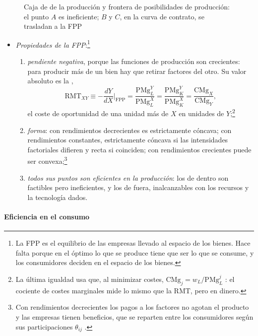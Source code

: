 \documentclass[11pt]{article}
\begin{document}
\begin{figure}[H]
\centering
\caption{Caja de  de la producción y frontera de posibilidades de producción: el punto $A$ es ineficiente; $B$ y $C$, en la curva de contrato, se trasladan a la FPP}\label{fig:caja-edgeworth-fpp}
\end{figure}

\begin{itemize}
\item \emph{Propiedades de la FPP}:\footnote{La FPP es el equilibrio de las empresas llevado al espacio de los bienes. Hace falta porque en el óptimo lo que se produce tiene que ser lo que se consume, y los consumidores deciden en el espacio de los bienes.}
  \begin{enumerate}
  \item \emph{pendiente negativa}, porque las funciones de producción son crecientes: para producir más de un bien hay que retirar factores del otro. Su valor absoluto es la ,
  $$\mathrm{RMT}_{XY}\equiv-\frac{dY}{dX}\Big|_{\text{FPP}}=\frac{\mathrm{PMg}^Y_L}{\mathrm{PMg}^X_L}=\frac{\mathrm{PMg}^Y_K}{\mathrm{PMg}^X_K}=\frac{\mathrm{CMg}_X}{\mathrm{CMg}_Y},$$
  el coste de oportunidad de una unidad más de $X$ en unidades de $Y$;\footnote{La última igualdad usa que, al minimizar costes, $\mathrm{CMg}_j=w_L/\mathrm{PMg}^j_L$ : el cociente de costes marginales mide lo mismo que la $\mathrm{RMT}$, pero en dinero.}
  \item \emph{forma}: con rendimientos decrecientes es estrictamente cóncava; con rendimientos constantes, estrictamente cóncava si las intensidades factoriales difieren y recta si coinciden; con rendimientos crecientes puede ser convexa;\footnote{Con rendimientos decrecientes los pagos a los factores no agotan el producto y las empresas tienen beneficios, que se reparten entre los consumidores según sus participaciones $\theta_{ij}$ .}
  \item \emph{todos sus puntos son eficientes en la producción}: los de dentro son factibles pero ineficientes, y los de fuera, inalcanzables con los recursos y la tecnología dados.
  \end{enumerate}
\end{itemize}

\paragraph{Eficiencia en el consumo}
\end{document}
